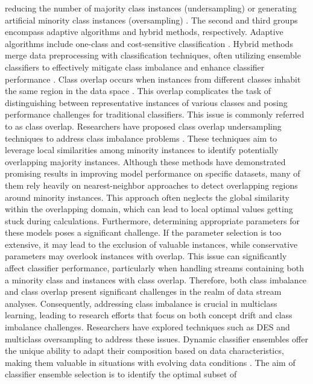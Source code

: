   reducing the number of majority class instances (undersampling) or generating artificial minority class instances (oversampling)
  \cite{liu2018making,lopez2012analysis}. The second and third groups encompass adaptive algorithms and hybrid methods, respectively. Adaptive algorithms include
  one-class and cost-sensitive classification \cite{zhang2020towards}. Hybrid methods merge data preprocessing with classification techniques, often utilizing ensemble classifiers to effectively mitigate class imbalance and enhance classifier performance \cite{chawla2003smoteboost, wang2010negative, bhowan2012evolving}.
  Class overlap occurs when instances from different classes inhabit the same region in the data space \cite{galar2011review, cruz2018dynamic}. This overlap complicates the task of distinguishing between representative instances of various classes and posing performance challenges for traditional classifiers. This issue is commonly referred to as class overlap. Researchers have proposed class overlap undersampling
  techniques to address class imbalance problems \cite{kuncheva2000clustering}. These techniques aim to leverage local similarities among minority instances to
  identify potentially overlapping majority instances. Although these methods have demonstrated promising results in improving model
  performance on specific datasets, many of them rely heavily on nearest-neighbor approaches to detect overlapping regions around
  minority instances. This approach often neglects the global similarity within the overlapping domain, which can lead to local optimal
  values getting stuck during calculations. Furthermore, determining appropriate parameters for these models poses a significant
  challenge. If the parameter selection is too extensive, it may lead to the exclusion of valuable instances, while conservative parameters
  may overlook instances with overlap. This issue can significantly affect classifier performance, particularly when handling streams
  containing both a minority class and instances with class overlap. Therefore, both class imbalance and class overlap present significant
  challenges in the realm of data stream analyses. Consequently, addressing class imbalance is crucial in multiclass learning, leading to
  research efforts that focus on both concept drift and class imbalance challenges. Researchers have explored techniques such as DES and
  multiclass oversampling to address these issues.
  Dynamic classifier ensembles offer the unique ability to adapt their composition based on data characteristics, making them
  valuable in situations with evolving data conditions \cite{woloszynski2011probabilistic}. The aim of classifier ensemble selection is to identify the optimal subset of
